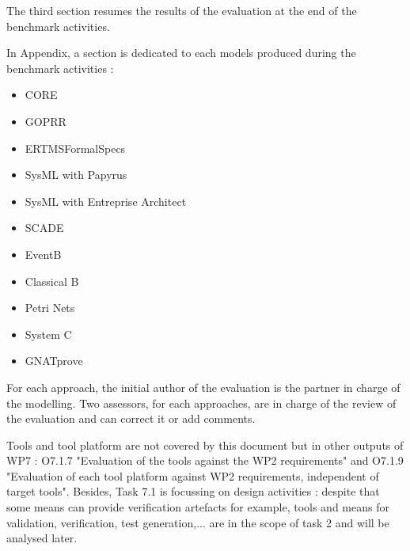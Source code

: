 The third section resumes the results of the evaluation at the end of the benchmark activities.

In Appendix, a section is dedicated to each models produced during the benchmark activities :
\begin{itemize}
\item  CORE
\item  GOPRR
\item  ERTMSFormalSpecs
\item  SysML with Papyrus
\item  SysML with Entreprise Architect
\item  SCADE
\item  EventB 
\item  Classical B 
\item  Petri Nets
\item  System C
\item  GNATprove
\end{itemize}

For each approach, the initial  author of the evaluation is the partner in charge of the modelling. Two assessors, for each approaches,  are in charge of the review of the evaluation and can correct it or add comments.

Tools and tool platform are not covered by this document but in other outputs of WP7 : O7.1.7  "Evaluation of the tools against the WP2 requirements" and O7.1.9 "Evaluation of each tool platform against WP2 requirements, independent of target tools".
Besides, Task 7.1 is focussing on design activities : despite that some means can provide verification artefacts for example,  tools and means for validation, verification, test generation,... are in the scope of task 2 and will be analysed later.